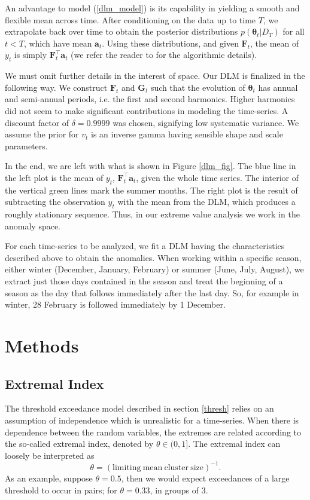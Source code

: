 \documentclass[12pt]{article}
\newcommand{\m}[1]{\mathbf{\bm{#1}}}
\begin{document}
An advantage to model (\ref{dlm_model}) is its capability in yielding a smooth and flexible mean across time. After conditioning on the data up to time $T$, we extrapolate back over time to obtain the posterior distributions $p(\m{\theta}_t|D_T)$ for all $t<T$, which have mean $\m{a}_t$. Using these distributions, and given $\m{F}_t$, the mean of $y_t$ is simply $\m{F}_t^\top\m{a}_t$ (we refer the reader to \cite{prado2010time} for the algorithmic details).

We must omit further details in the interest of space. Our DLM is finalized in the following way. We construct $\m{F}_t$ and $\m{G}_t$ such that the evolution of $\m{\theta}_t$ has annual and semi-annual periods, i.e. the first and second harmonics. Higher harmonics did not seem to make significant contributions in modeling the time-series. A discount factor of $\delta=0.9999$ was chosen, signifying low systematic variance. We assume the prior for $v_t$ is an inverse gamma having sensible shape and scale parameters.

In the end, we are left with what is shown in Figure \ref{dlm_fig}. The blue line in the left plot is the mean of $y_t$, $\m{F}_t^\top\m{a}_t$, given the whole time series. The interior of the vertical green lines mark the summer months. The right plot is the result of subtracting the observation $y_t$ with the mean from the DLM, which produces a roughly stationary sequence. Thus, in our extreme value analysis we work in the anomaly space.

For each time-series to be analyzed, we fit a DLM having the characteristics described above to obtain the anomalies. When working within a specific season, either winter (December, January, February) or summer (June, July, August), we extract just those days contained in the season and treat the beginning of a season as the day that follows immediately after the last day. So, for example in winter, 28 February is followed immediately by 1 December.


\section{Methods}

\subsection{Extremal Index}
\label{index}

The threshold exceedance model described in section \ref{thresh} relies on an assumption of independence which is unrealistic for a time-series. When there is dependence between the random variables, the extremes are related according to the so-called extremal index, denoted by $\theta\in(0,1]$. The extremal index can loosely be interpreted as
\[ \theta = (\mathrm{limiting~mean~cluster~size})^{-1}. \]
As an example, suppose $\theta=0.5$, then we would expect exceedances of a large threshold to occur in pairs; for $\theta=0.33$, in groups of 3.
\end{document}
